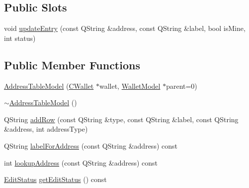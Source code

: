 \subsection*{Public Slots}
\begin{DoxyCompactItemize}
\item 
void \hyperlink{class_address_table_model_a78d9d6f3db0ced72a29a32f487ab1c7f}{update\+Entry} (const Q\+String \&address, const Q\+String \&label, bool is\+Mine, int status)
\end{DoxyCompactItemize}
\subsection*{Public Member Functions}
\begin{DoxyCompactItemize}
\item 
\hyperlink{class_address_table_model_a273787011f7e387cc68b8282539fb9ef}{Address\+Table\+Model} (\hyperlink{class_c_wallet}{C\+Wallet} $\ast$wallet, \hyperlink{class_wallet_model}{Wallet\+Model} $\ast$parent=0)
\item 
\hyperlink{class_address_table_model_a1684bd5318c019064a28eb36efd11ea6}{$\sim$\+Address\+Table\+Model} ()
\item 
Q\+String \hyperlink{class_address_table_model_a08ab9ae401a18d193f0e39551de81280}{add\+Row} (const Q\+String \&type, const Q\+String \&label, const Q\+String \&address, int address\+Type)
\item 
Q\+String \hyperlink{class_address_table_model_a1c39ce19eecfc9f3ace10435b162607f}{label\+For\+Address} (const Q\+String \&address) const 
\item 
int \hyperlink{class_address_table_model_a49a260d5e629286f6277a2dbc0aaeaaa}{lookup\+Address} (const Q\+String \&address) const 
\item 
\hyperlink{class_address_table_model_a3d502b85fc09461e779dae4589c29956}{Edit\+Status} \hyperlink{class_address_table_model_a4bd9d9835681e87c320f486eeae42968}{get\+Edit\+Status} () const 
\end{DoxyCompactItemize}

